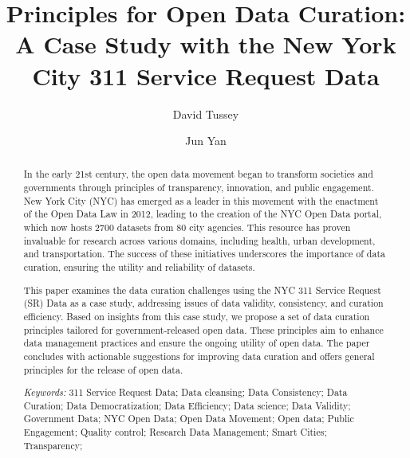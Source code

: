 \documentclass[12pt, titlepage]{article}
\title{Principles for Open Data Curation: A Case Study with the New
York City 311 Service Request Data}
\author[1]{David Tussey}
\author[2]{Jun Yan}
\affil[1]{Former Executive Director, NYC DoITT}
\affil[2]{Department of Statistics, University of Connecticut}
\begin{document}
\maketitle

\tableofcontents %
\listoffigures %
\listoftables %


\begin{abstract}
In the early 21st century, the open data movement began to transform 
societies and governments through principles of transparency, 
innovation, and public engagement. New York City (NYC) has emerged 
as a leader in this movement with the enactment of the Open 
Data Law in 2012, leading to the creation of the NYC Open Data 
portal, which now hosts 2700 datasets from 80 city agencies. This 
resource has proven invaluable for research across various domains, 
including health, urban development, and transportation. The 
success of these initiatives underscores the importance of data 
curation, ensuring the utility and reliability of datasets. 

This paper examines the data curation challenges using the 
NYC 311 Service Request (SR) Data as a case study, addressing issues 
of data validity, consistency, and curation efficiency. Based on 
insights from this case study, we propose a set of data curation 
principles tailored for government-released open data. These principles 
aim to enhance data management practices and ensure 
the ongoing utility of open data. The paper concludes with 
actionable suggestions for improving data curation and offers 
general principles for the release of open data.

\bigskip
  
\noindent
\textit{Keywords:}
	311 Service Request Data;
	Data cleansing;
	Data Consistency;
	Data Curation;
	Data Democratization;
	Data Efficiency;
	Data science;
	Data Validity;
	Government Data;
	NYC Open Data;
	Open Data Movement;
	Open data;
	Public Engagement;
	Quality control;
	Research Data Management;
	Smart Cities;
	Transparency;
\end{abstract}

\doublespacing
\end{document}
